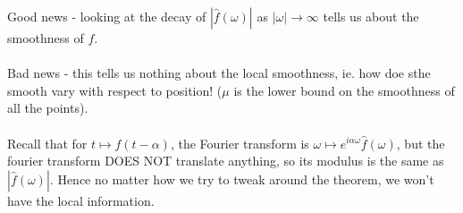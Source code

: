 \documentclass{article}
\begin{document}
Good news - looking at the decay of $|\widehat{f}(\omega)|$ as $|\omega| \to \infty$ tells us about the smoothness of $f$.\\\\

Bad news - this tells us nothing about the local smoothness, ie. how doe sthe smooth vary with respect to position! ($\mu$ is the lower bound on the smoothness of all the points).\\\\

Recall that for $t \mapsto f(t - \alpha)$, the Fourier transform is $\omega \mapsto e^{i \alpha \omega} \widehat{f}(\omega)$, but the fourier transform DOES NOT translate anything, so its modulus is the same as $|\widehat{f}(\omega)|$. Hence no matter how we try to tweak around the theorem, we won't have the local information.
\end{document}
